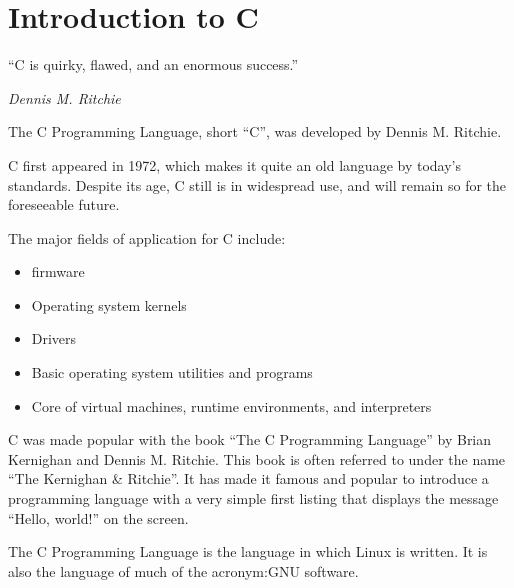 \chapter{Introduction to C}
\epigraph{``C is quirky, flawed, and an enormous success.''}{\em Dennis M. Ritchie\em}

The C Programming Language, short ``C'', was developed by Dennis M. Ritchie.

C first appeared in 1972, which makes it quite an old language by today's standards.
Despite its age, C still is in widespread use, and will remain so for the foreseeable future.

The major fields of application for C include:
\begin{itemize}
\item \Gls{firmware}
\item Operating system kernels
\item Drivers
\item Basic operating system utilities and programs
\item Core of virtual machines, runtime environments, and interpreters
\end{itemize}

C was made popular with the book ``The C Programming Language''\cite{kernighanAndRitchie} by Brian Kernighan and Dennis M. Ritchie.
This book is often referred to under the name ``The Kernighan \& Ritchie''.
It has made it famous and popular to introduce a programming language with a very simple first listing that displays the message ``Hello, world!'' on the screen.



The C Programming Language is the language in which Linux is written.
It is also the language of much of the \acrshort{acronym:GNU} software.

